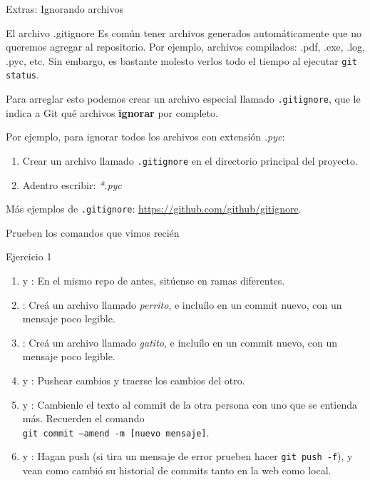 \begin{frame}[t]{Extras: Ignorando archivos}

    \begin{block}{El archivo .gitignore}
      Es común tener archivos generados automáticamente que no queremos agregar al repositorio. Por ejemplo, archivos compilados: .pdf, .exe, .log, .pyc, etc. Sin embargo, es bastante molesto verlos todo el tiempo al ejecutar \texttt{git status}.

      Para arreglar esto podemos crear un archivo especial llamado \texttt{.gitignore}, que le indica a Git qué archivos \textbf{ignorar} por completo.
    \end{block}

    \pause
    \begin{resumen}{}
      Por ejemplo, para ignorar todos los archivos con extensión \textit{.pyc}:
      \begin{enumerate}
        \item Crear un archivo llamado \texttt{.gitignore} en el directorio principal del proyecto.
        \item Adentro escribir: \textit{*.pyc}
      \end{enumerate}
      Más ejemplos de \texttt{.gitignore}: \url{https://github.com/github/gitignore}.
    \end{resumen}

\end{frame}

\begin{frame}{Prueben los comandos que vimos recién}
    \begin{ejercicio}{Ejercicio 1}
    \begin{enumerate}
        \item {} y : En el mismo repo de antes, sitúense en ramas diferentes.
        \item {}: Creá un archivo llamado \textit{perrito}, e incluílo en un commit nuevo, con un mensaje poco legible.
        \item {}: Creá un archivo llamado \textit{gatito}, e incluílo en un commit nuevo, con un mensaje poco legible.
        \item {} y : Pushear cambios y traerse los cambios del otro. 
        \item {} y : Cambienle el texto al commit de la otra persona con uno que se entienda más. 
        Recuerden el comando\\ \texttt{git commit --amend -m [nuevo mensaje]}.
        \item {} y : Hagan push (si tira un mensaje de error prueben hacer \texttt{git push -f}), y vean como cambió su historial de commits tanto en la web como local.
    \end{enumerate}
    \end{ejercicio}
\end{frame}


